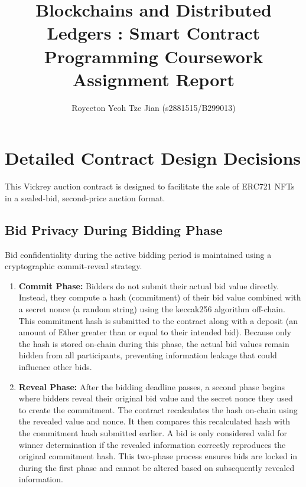 \documentclass[11pt, a4paper]{article}
\title{Blockchains and Distributed Ledgers : Smart Contract Programming Coursework Assignment Report}
\author{Royceton Yeoh Tze Jian (s2881515/B299013)} %
\date{}
\begin{document}
\maketitle

\section{Detailed Contract Design Decisions}
This Vickrey auction contract is designed to facilitate the sale of ERC721 NFTs in a sealed-bid, second-price auction format.

\subsection{Bid Privacy During Bidding Phase}
Bid confidentiality during the active bidding period is maintained using a cryptographic commit-reveal strategy.
\begin{enumerate}
    \item \textbf{Commit Phase:} Bidders do not submit their actual bid value directly. Instead, they compute a hash (commitment) of their bid value combined with a secret nonce (a random string) using the keccak256 algorithm off-chain. This commitment hash is submitted to the contract along with a deposit (an amount of Ether greater than or equal to their intended bid). Because only the hash is stored on-chain during this phase, the actual bid values remain hidden from all participants, preventing information leakage that could influence other bids.
    \item \textbf{Reveal Phase:} After the bidding deadline passes, a second phase begins where bidders reveal their original bid value and the secret nonce they used to create the commitment. The contract recalculates the hash on-chain using the revealed value and nonce. It then compares this recalculated hash with the commitment hash submitted earlier. A bid is only considered valid for winner determination if the revealed information correctly reproduces the original commitment hash. This two-phase process ensures bids are locked in during the first phase and cannot be altered based on subsequently revealed information.
\end{enumerate}
\end{document}
